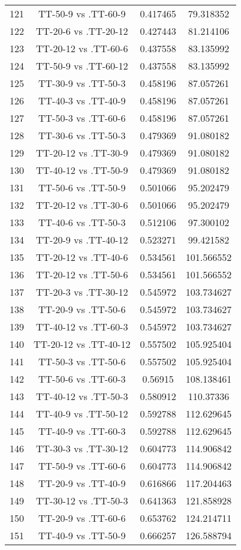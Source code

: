 \documentclass[a4paper,10pt]{article}
\begin{document}
\begin{landscape}
\begin{table}[!htp]
\begin{tabular}{cccc}
121&TT-50-9 vs .TT-60-9&0.417465&79.318352\\
122&TT-20-6 vs .TT-20-12&0.427443&81.214106\\
123&TT-20-12 vs .TT-60-6&0.437558&83.135992\\
124&TT-50-9 vs .TT-60-12&0.437558&83.135992\\
125&TT-30-9 vs .TT-50-3&0.458196&87.057261\\
126&TT-40-3 vs .TT-40-9&0.458196&87.057261\\
127&TT-50-3 vs .TT-60-6&0.458196&87.057261\\
128&TT-30-6 vs .TT-50-3&0.479369&91.080182\\
129&TT-20-12 vs .TT-30-9&0.479369&91.080182\\
130&TT-40-12 vs .TT-50-9&0.479369&91.080182\\
131&TT-50-6 vs .TT-50-9&0.501066&95.202479\\
132&TT-20-12 vs .TT-30-6&0.501066&95.202479\\
133&TT-40-6 vs .TT-50-3&0.512106&97.300102\\
134&TT-20-9 vs .TT-40-12&0.523271&99.421582\\
135&TT-20-12 vs .TT-40-6&0.534561&101.566552\\
136&TT-20-12 vs .TT-50-6&0.534561&101.566552\\
137&TT-20-3 vs .TT-30-12&0.545972&103.734627\\
138&TT-20-9 vs .TT-50-6&0.545972&103.734627\\
139&TT-40-12 vs .TT-60-3&0.545972&103.734627\\
140&TT-20-12 vs .TT-40-12&0.557502&105.925404\\
141&TT-50-3 vs .TT-50-6&0.557502&105.925404\\
142&TT-50-6 vs .TT-60-3&0.56915&108.138461\\
143&TT-40-12 vs .TT-50-3&0.580912&110.37336\\
144&TT-40-9 vs .TT-50-12&0.592788&112.629645\\
145&TT-40-9 vs .TT-60-3&0.592788&112.629645\\
146&TT-30-3 vs .TT-30-12&0.604773&114.906842\\
147&TT-50-9 vs .TT-60-6&0.604773&114.906842\\
148&TT-20-9 vs .TT-40-9&0.616866&117.204463\\
149&TT-30-12 vs .TT-50-3&0.641363&121.858928\\
150&TT-20-9 vs .TT-60-6&0.653762&124.214711\\
151&TT-40-9 vs .TT-50-9&0.666257&126.588794\\

\end{tabular}
\end{table}
\end{landscape}
\end{document}
